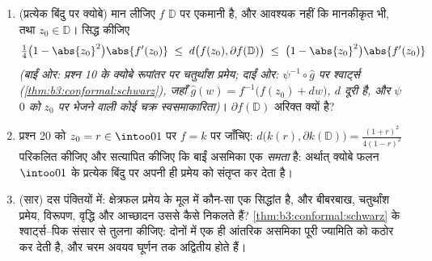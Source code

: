 \begin{problem}
\begin{enumerate}[resume]
        जो क्योबे फलन के लिए तीक्ष्ण है, और $r \to 1^-$ के रूप में
        चतुर्थांश प्रमेय पुनः प्राप्त कीजिए। \emph{(विवृत
        प्रतिबिंब $f(D(0,r))$ के परिसीमा बिंदु $f(\partial D(0,r))$ पर होते हैं, अतः
        प्रश्न 14 से उनका मापांक $\geq
        \frac{r}{(1+r)^2}$ होता है; और $0$ से किसी
        छोटे मापांक वाले छूटे बिंदु तक का कोई रेखाखंड उस परिसीमा
        को पार करता।)}
  \item (प्रत्येक बिंदु पर क्योबे) मान लीजिए $f$ $\mathbb D$ पर एकमानी
        है, और आवश्यक नहीं कि मानकीकृत भी, तथा $z_0
        \in \mathbb D$। सिद्ध
        कीजिए
        \[
        \tfrac14\bigl(1 - \abs{z_0}^2\bigr)\abs{f'(z_0)}
        \;\leq\;
        d\bigl(f(z_0), \partial f(\mathbb D)\bigr)
        \;\leq\;
        \bigl(1 - \abs{z_0}^2\bigr)\abs{f'(z_0)}
        \]
        \emph{(बाईं ओर: प्रश्न 10 के क्योबे रूपांतर पर चतुर्थांश
        प्रमेय; दाईं ओर: $\psi^{-1}\circ\hat g$ पर श्वार्ट्स (\cref{thm:b3:conformal:schwarz}), जहाँ $\hat g(w) =
        f^{-1}\bigl(f(z_0) + dw\bigr)$,
        $d$ दूरी है, और $\psi$ $0$ को $z_0$ पर भेजने वाली कोई
        चक्र स्वसमाकारिता)}। $\partial f(\mathbb D)$ अरिक्त क्यों है?
  \item प्रश्न 20 को $z_0 = r \in
        \intoo01$ पर $f = k$ पर जाँचिए: $d\bigl(k(r), \partial k(\mathbb
        D)\bigr) = \frac{(1+r)^2}{4(1-r)^2}$ परिकलित
        कीजिए और सत्यापित कीजिए कि बाईं असमिका एक \emph{समता} है:
        अर्थात् क्योबे फलन $\intoo01$ के प्रत्येक बिंदु पर अपनी ही
        प्रमेय को संतृप्त कर देता है।
  \item (सार) दस पंक्तियों में: क्षेत्रफल प्रमेय के मूल में
        कौन-सा एक सिद्धांत है, और बीबरबाख, चतुर्थांश प्रमेय,
        विरूपण, वृद्धि और आच्छादन उससे कैसे निकलते हैं? \cref{thm:b3:conformal:schwarz} के
        श्वार्ट्स--पिक संसार से तुलना कीजिए: दोनों में एक ही
        आंतरिक असमिका पूरी ज्यामिति को कठोर कर देती है, और चरम
        अवयव घूर्णन तक अद्वितीय होते हैं।


\end{enumerate}
\end{problem}
